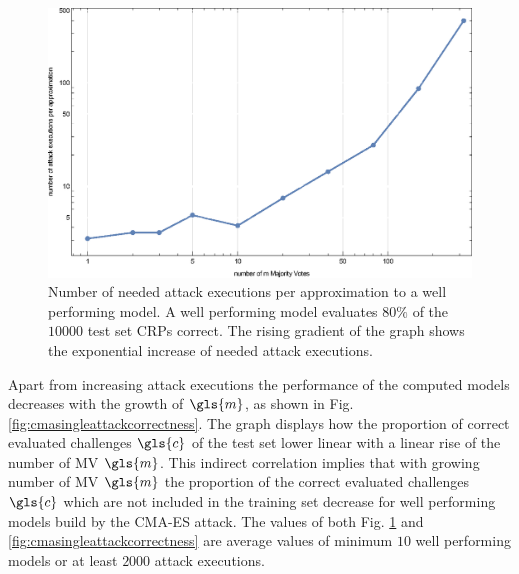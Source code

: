 \begin{figure}[ht]
\includegraphics[width=1.00\textwidth]{images/single-mv-classification-cma-attack-correlation.eps}
\caption[Needed \acs{CMA-ES} attack executions for \mpufs]{Number of needed attack executions per approximation to a well performing model. A well performing model evaluates $80 \%$ of the $10000$ test set \acp{CRP} correct. The rising gradient of the graph shows the exponential increase of needed attack executions.}
\label{fig:cmasingleattackcorrelation}
\end{figure}

Apart from increasing attack executions the performance of the computed models decreases with the growth of $\gls{m}$, as shown in Fig. \ref{fig:cmasingleattackcorrectness}.
The graph displays how the proportion of correct evaluated challenges $\gls{c}$ of the test set lower linear with a linear rise of the number of \ac{MV} $\gls{m}$.
This indirect correlation implies that with growing number of \ac{MV} $\gls{m}$ the proportion of the correct evaluated challenges $\gls{c}$ which are not included in the training set decrease for well performing models build by the \ac{CMA-ES} attack.
The values of both Fig. \ref{fig:cmasingleattackcorrelation} and \ref{fig:cmasingleattackcorrectness} are average values of minimum $10$ well performing models or at least $2000$ attack executions.

